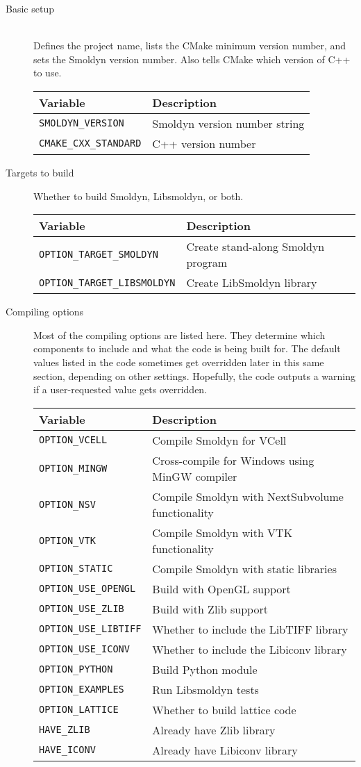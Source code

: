 \documentclass {scrbook}
\newcommand {\ttt} {\texttt}
\begin{document}
\begin{description}

\item[Basic setup]
\hfill \\
Defines the project name, lists the CMake minimum version number, and sets the Smoldyn version number. Also tells CMake which version of C++ to use.\\
\begin{longtable}[c]{ll}
Variable & Description\\
\hline
\ttt{SMOLDYN\_VERSION} & Smoldyn version number string\\
\ttt{CMAKE\_CXX\_STANDARD} & C++ version number\\
\end{longtable}

\item[Targets to build]
Whether to build Smoldyn, Libsmoldyn, or both.
\begin{longtable}[c]{ll}
Variable & Description\\
\hline
\ttt{OPTION\_TARGET\_SMOLDYN} & Create stand-along Smoldyn program\\
\ttt{OPTION\_TARGET\_LIBSMOLDYN} & Create LibSmoldyn library\\
\end{longtable}

\item[Compiling options]
Most of the compiling options are listed here. They determine which components to include and what the code is being built for. The default values listed in the code sometimes get overridden later in this same section, depending on other settings. Hopefully, the code outputs a warning if a user-requested value gets overridden.
\begin{longtable}[c]{ll}
Variable & Description\\
\hline
\ttt{OPTION\_VCELL} & Compile Smoldyn for VCell\\
\ttt{OPTION\_MINGW} & Cross-compile for Windows using MinGW compiler\\
\ttt{OPTION\_NSV} & Compile Smoldyn with NextSubvolume functionality\\
\ttt{OPTION\_VTK} & Compile Smoldyn with VTK functionality\\
\ttt{OPTION\_STATIC} & Compile Smoldyn with static libraries\\
\ttt{OPTION\_USE\_OPENGL} & Build with OpenGL support\\
\ttt{OPTION\_USE\_ZLIB} & Build with Zlib support\\
\ttt{OPTION\_USE\_LIBTIFF} & Whether to include the LibTIFF library\\
\ttt{OPTION\_USE\_ICONV} & Whether to include the Libiconv library\\
\ttt{OPTION\_PYTHON}  & Build Python module\\
\ttt{OPTION\_EXAMPLES} & Run Libsmoldyn tests\\
\ttt{OPTION\_LATTICE} & Whether to build lattice code\\
\ttt{HAVE\_ZLIB} & Already have Zlib library\\
\ttt{HAVE\_ICONV} & Already have Libiconv library\\
\end{longtable}


\end{description}
\end{document}

